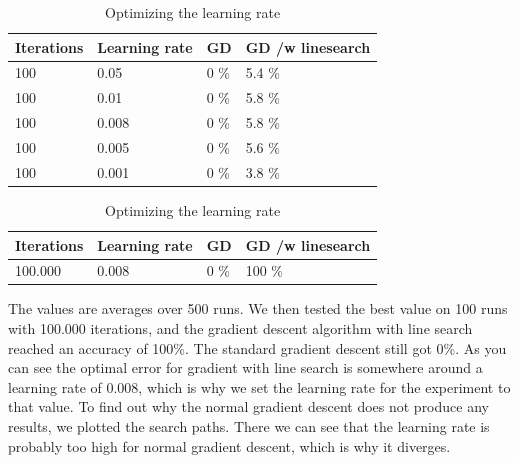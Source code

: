 \documentclass{article}
\begin{document}
\begin{table}[H]
    \parbox{.45\linewidth}{
	\centering
		\begin{tabular}{|l|l|l|l|}
        \hline
		Iterations & Learning rate & GD & GD /w linesearch \\ \hline 
		100 & 0.05 & 0 \% & 5.4 \% \\ \hline
		100 & 0.01 & 0 \% & 5.8 \% \\ \hline
		100 & 0.008 & 0 \% & 5.8 \% \\ \hline
		100 & 0.005 & 0 \% & 5.6 \% \\ \hline
		100 & 0.001 & 0 \% & 3.8 \% \\ \hline
		\end{tabular}
    }
    \hfill
    \parbox{.45\linewidth}{
	\centering
		\begin{tabular}{|l|l|l|l|}
        \hline
		Iterations & Learning rate & GD & GD /w linesearch \\ \hline 
		100.000 & 0.008 & 0 \% & 100 \% \\ \hline
		\end{tabular}
    }
    \caption{Optimizing the learning rate}
    \label{tab:learningrate}
\end{table}
    
The values are averages over 500 runs. We then tested the best value on 100 runs with 100.000 iterations, and the gradient descent algorithm with line search reached an accuracy of 100\%. The standard gradient descent still got 0\%.
As you can see the optimal error for gradient with line search is somewhere around a learning rate of 0.008, which is why we set the learning rate for the experiment to that value. To find out why the normal gradient descent does not produce any results, we plotted the search paths. There we can see that the learning rate is probably too high for normal gradient descent, which is why it diverges. \\
\end{document}
